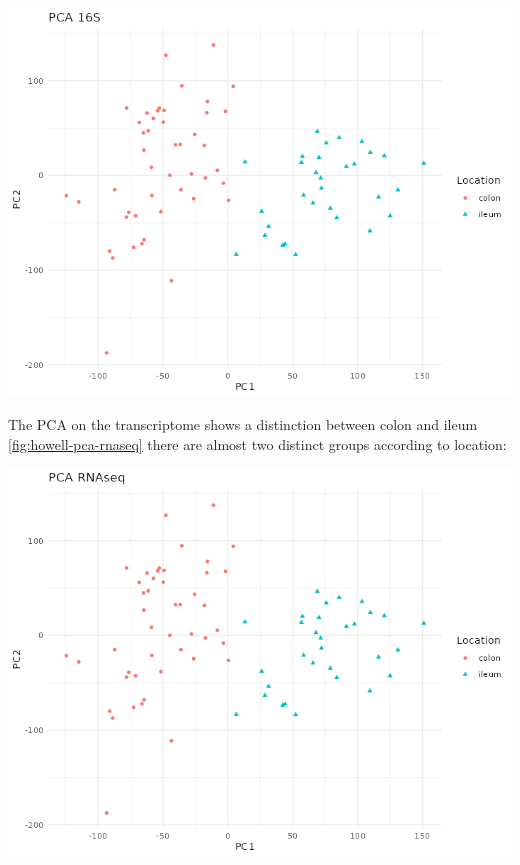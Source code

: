 \documentclass[
  12pt,
  a4paper,
  twoside,
  openright]{book}
\let\origfigure\figure
\let\endorigfigure\endfigure
\renewenvironment{figure}[1][2] {
    \expandafter\origfigure\expandafter[!htp]
} {
    \endorigfigure
}
\begin{document}
\begin{figure}
\includegraphics[width=1\linewidth]{images/howell_PCA_16S} \caption[PCA of 16S data of the Howell's dataset]{PCA of 16S data of the Howell's dataset. Samples are colored by location. There are no pattern on any of the first do dimensions.}\label{fig:howell-pca-16s}
\end{figure}

The PCA on the transcriptome shows a distinction between colon and ileum \ref{fig:howell-pca-rnaseq} there are almost two distinct groups according to location:

\begin{figure}
\includegraphics[width=1\linewidth]{images/howell_PCA_RNAseq} \caption[PCA of RNASeq data of the Howell's dataset]{PCA of RNAseq data of the Howell's dataset. Samples are colored by location. There are two groups of samples according to their location.}\label{fig:howell-pca-rnaseq}
\end{figure}
\end{document}
